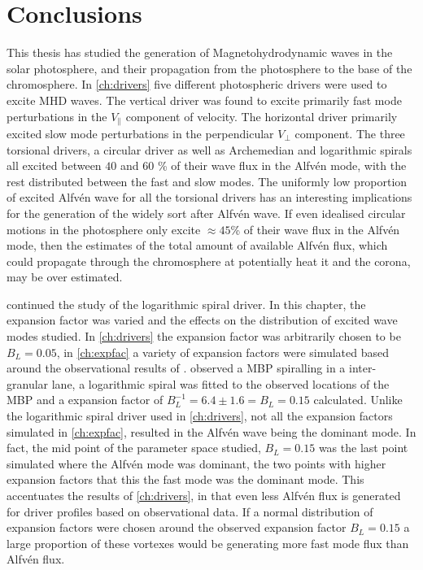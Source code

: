 
\chapter{Conclusions}\label{ch:conclusions}

This thesis has studied the generation of Magnetohydrodynamic waves in the solar photosphere, and their propagation from the photosphere to the base of the chromosphere.
In \cref{ch:drivers} five different photospheric drivers were used to excite MHD waves.
The vertical driver was found to excite primarily fast mode perturbations in the $V_\parallel$ component of velocity.
The horizontal driver primarily excited slow mode perturbations in the perpendicular $V_\perp$ component.
The three torsional drivers, a circular driver as well as Archemedian and logarithmic spirals all excited between $40$ and $60$ \% of their wave flux in the Alfv\'en mode, with the rest distributed between the fast and slow modes.
The uniformly low proportion of excited Alfv\'en wave for all the torsional drivers has an interesting implications for the generation of the widely sort after Alfv\'en wave.
If even idealised circular motions in the photosphere only excite $\approx 45$\% of their wave flux in the Alfv\'en mode, then the estimates of the total amount of available Alfv\'en flux, which could propagate through the chromosphere at potentially heat it and the corona, may be over estimated.

 continued the study of the logarithmic spiral driver.
In this chapter, the expansion factor was varied and the effects on the distribution of excited wave modes studied.
In \cref{ch:drivers} the expansion factor was arbitrarily chosen to be $B_L = 0.05$, in \cref{ch:expfac} a variety of expansion factors were simulated based around the observational results of \cite{bonet2008}.
\cite{bonet2008} observed a MBP spiralling in a inter-granular lane, a logarithmic spiral was fitted to the observed locations of the MBP and a expansion factor of $B_L^{-1} = 6.4 \pm 1.6 = B_L = 0.15$ calculated.
Unlike the logarithmic spiral driver used in \cref{ch:drivers}, not all the expansion factors simulated in \cref{ch:expfac}, resulted in the Alfv\'en wave being the dominant mode.
In fact, the mid point of the parameter space studied, $B_L = 0.15$ was the last point simulated where the Alfv\'en mode was dominant, the two points with higher expansion factors that this the fast mode was the dominant mode.
This accentuates the results of \cref{ch:drivers}, in that even less Alfv\'en flux is generated for driver profiles based on observational data.
If a normal distribution of expansion factors were chosen around the observed expansion factor $B_L = 0.15$ a large proportion of these vortexes would be generating more fast mode flux than Alfv\'en flux.

